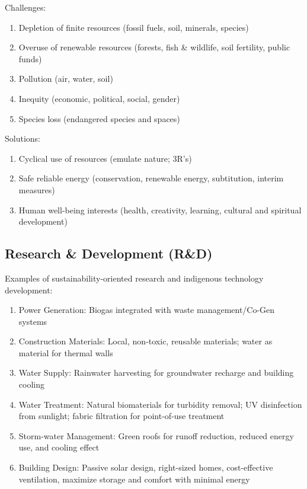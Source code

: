 \documentclass[12pt, a4paper]{article}
\begin{document}
\begin{multicols*}{3}
Challenges:
\begin{enumerate}[\roman*.]
  \item Depletion of finite resources (fossil fuels, soil, minerals, species)
  \item Overuse of renewable resources (forests, fish \& wildlife, soil fertility, public funds)
  \item Pollution (air, water, soil)
  \item Inequity (economic, political, social, gender)
  \item Species loss (endangered species and spaces)
\end{enumerate}

Solutions:
\begin{enumerate}[\roman*.]
  \item Cyclical use of resources (emulate nature; 3R's)
  \item Safe reliable energy (conservation, renewable energy, subtitution, interim measures)
  \item Human well-being interests (health, creativity, learning, cultural and spiritual development)
\end{enumerate}

\subsection{Research \& Development (R\&D)}
Examples of sustainability-oriented research and indigenous technology development:  
\begin{enumerate}[\roman*.]
  \item Power Generation: Biogas integrated with waste management/Co-Gen systems
  \item Construction Materials: Local, non-toxic, reusable materials; water as material for thermal walls
  \item Water Supply: Rainwater harvesting for groundwater recharge and building cooling
  \item Water Treatment: Natural biomaterials for turbidity removal; UV disinfection from sunlight; fabric filtration for point-of-use treatment
  \item Storm-water Management: Green roofs for runoff reduction, reduced energy use, and cooling effect
\item Building Design: Passive solar design, right-sized homes, cost-effective ventilation, maximize storage and comfort with minimal energy
\end{enumerate}


\end{multicols*}
\end{document}
